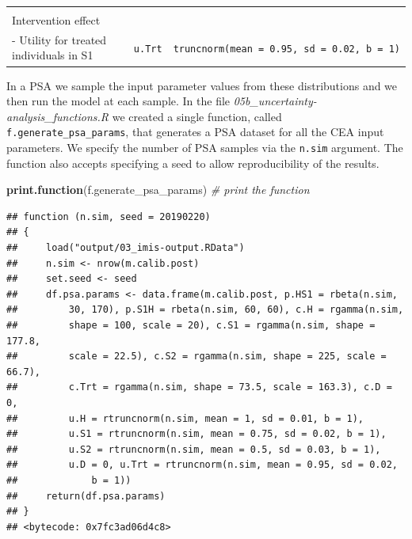 \documentclass[]{article}
\newenvironment{Shaded}{\begin{snugshade}}{\end{snugshade}}
\newcommand{\KeywordTok}[1]{\textcolor[rgb]{0.13,0.29,0.53}{\textbf{#1}}}
\newcommand{\CommentTok}[1]{\textcolor[rgb]{0.56,0.35,0.01}{\textit{#1}}}
\newcommand{\NormalTok}[1]{#1}
\begin{document}
\begin{longtable}[]{@{}lcc@{}}
\begin{minipage}[t]{0.20\columnwidth}
\end{minipage}\tabularnewline
\begin{minipage}[t]{0.43\columnwidth}\raggedright\strut
Intervention effect\strut
\end{minipage} & \begin{minipage}[t]{0.18\columnwidth}\centering\strut
\strut
\end{minipage} & \begin{minipage}[t]{0.20\columnwidth}\centering\strut
\strut
\end{minipage}\tabularnewline
\begin{minipage}[t]{0.43\columnwidth}\raggedright\strut
- Utility for treated individuals in S1\strut
\end{minipage} & \begin{minipage}[t]{0.18\columnwidth}\centering\strut
\texttt{u.Trt}\strut
\end{minipage} & \begin{minipage}[t]{0.20\columnwidth}\centering\strut
\texttt{truncnorm(mean\ =\ 0.95,\ sd\ =\ 0.02,\ b\ =\ 1)}\strut
\end{minipage}\tabularnewline
\bottomrule
\end{longtable}

In a PSA we sample the input parameter values from these distributions
and we then run the model at each sample. In the file
\emph{05b\_uncertainty-analysis\_functions.R} we created a single
function, called \texttt{f.generate\_psa\_params}, that generates a PSA
dataset for all the CEA input parameters. We specify the number of PSA
samples via the \texttt{n.sim} argument. The function also accepts
specifying a seed to allow reproducibility of the results.

\begin{Shaded}
\begin{Highlighting}[]
\KeywordTok{print.function}\NormalTok{(f.generate_psa_params) }\CommentTok{# print the function }
\end{Highlighting}
\end{Shaded}

\begin{verbatim}
## function (n.sim, seed = 20190220) 
## {
##     load("output/03_imis-output.RData")
##     n.sim <- nrow(m.calib.post)
##     set.seed <- seed
##     df.psa.params <- data.frame(m.calib.post, p.HS1 = rbeta(n.sim, 
##         30, 170), p.S1H = rbeta(n.sim, 60, 60), c.H = rgamma(n.sim, 
##         shape = 100, scale = 20), c.S1 = rgamma(n.sim, shape = 177.8, 
##         scale = 22.5), c.S2 = rgamma(n.sim, shape = 225, scale = 66.7), 
##         c.Trt = rgamma(n.sim, shape = 73.5, scale = 163.3), c.D = 0, 
##         u.H = rtruncnorm(n.sim, mean = 1, sd = 0.01, b = 1), 
##         u.S1 = rtruncnorm(n.sim, mean = 0.75, sd = 0.02, b = 1), 
##         u.S2 = rtruncnorm(n.sim, mean = 0.5, sd = 0.03, b = 1), 
##         u.D = 0, u.Trt = rtruncnorm(n.sim, mean = 0.95, sd = 0.02, 
##             b = 1))
##     return(df.psa.params)
## }
## <bytecode: 0x7fc3ad06d4c8>
\end{verbatim}
\end{document}
